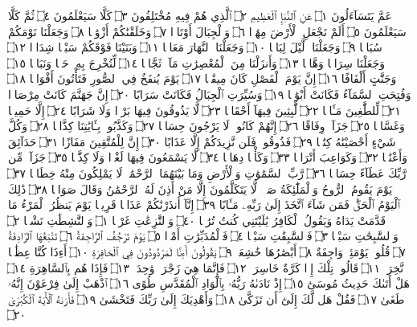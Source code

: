 عَمَّ يَتَسَآءَلُونَ ۝١ عَنِ ٱلنَّبَإِ ٱلْعَظِيمِ ۝٢ ٱلَّذِي هُمْ فِيهِ مُخْتَلِفُونَ ۝٣
كَلَّا سَيَعْلَمُونَ ۝٤ ثُمَّ كَلَّا سَيَعْلَمُونَ ۝٥ أَلَمْ نَجْعَلِ ٱلْأَرْضَ مِهَٰدࣰا ۝٦
وَٱلْجِبَالَ أَوْتَادࣰا ۝٧ وَخَلَقْنَٰكُمْ أَزْوَٰجࣰا ۝٨ وَجَعَلْنَا نَوْمَكُمْ سُبَاتࣰا ۝٩
وَجَعَلْنَا ٱلَّيْلَ لِبَاسࣰا ۝١٠ وَجَعَلْنَا ٱلنَّهَارَ مَعَاشࣰا ۝١١ وَبَنَيْنَا
فَوْقَكُمْ سَبْعࣰا شِدَادࣰا ۝١٢ وَجَعَلْنَا سِرَاجࣰا وَهَّاجࣰا ۝١٣ وَأَنزَلْنَا مِنَ
ٱلْمُعْصِرَٰتِ مَآءࣰ ثَجَّاجࣰا ۝١٤ لِّنُخْرِجَ بِهِۦ حَبࣰّا وَنَبَاتࣰا ۝١٥ وَجَنَّٰتٍ
أَلْفَافًا ۝١٦ إِنَّ يَوْمَ ٱلْفَصْلِ كَانَ مِيقَٰتࣰا ۝١٧ يَوْمَ يُنفَخُ فِي ٱلصُّورِ
فَتَأْتُونَ أَفْوَاجࣰا ۝١٨ وَفُتِحَتِ ٱلسَّمَآءُ فَكَانَتْ أَبْوَٰبࣰا ۝١٩ وَسُيِّرَتِ
ٱلْجِبَالُ فَكَانَتْ سَرَابًا ۝٢٠ إِنَّ جَهَنَّمَ كَانَتْ مِرْصَادࣰا ۝٢١ لِّلطَّٰغِينَ
مَـَٔابࣰا ۝٢٢ لَّٰبِثِينَ فِيهَآ أَحْقَابࣰا ۝٢٣ لَّا يَذُوقُونَ فِيهَا بَرْدࣰا وَلَا
شَرَابًا ۝٢٤ إِلَّا حَمِيمࣰا وَغَسَّاقࣰا ۝٢٥ جَزَآءࣰ وِفَاقًا ۝٢٦ إِنَّهُمْ كَانُوا۟
لَا يَرْجُونَ حِسَابࣰا ۝٢٧ وَكَذَّبُوا۟ بِـَٔايَٰتِنَا كِذَّابࣰا ۝٢٨ وَكُلَّ شَيْءٍ
أَحْصَيْنَٰهُ كِتَٰبࣰا ۝٢٩ فَذُوقُوا۟ فَلَن نَّزِيدَكُمْ إِلَّا عَذَابًا ۝٣٠
إِنَّ لِلْمُتَّقِينَ مَفَازًا ۝٣١ حَدَآئِقَ وَأَعْنَٰبࣰا ۝٣٢ وَكَوَاعِبَ أَتْرَابࣰا ۝٣٣ وَكَأْسࣰا
دِهَاقࣰا ۝٣٤ لَّا يَسْمَعُونَ فِيهَا لَغْوࣰا وَلَا كِذَّٰبࣰا ۝٣٥ جَزَآءࣰ مِّن رَّبِّكَ عَطَآءً
حِسَابࣰا ۝٣٦ رَّبِّ ٱلسَّمَٰوَٰتِ وَٱلْأَرْضِ وَمَا بَيْنَهُمَا ٱلرَّحْمَٰنِۖ لَا يَمْلِكُونَ
مِنْهُ خِطَابࣰا ۝٣٧ يَوْمَ يَقُومُ ٱلرُّوحُ وَٱلْمَلَٰٓئِكَةُ صَفࣰّاۖ لَّا يَتَكَلَّمُونَ
إِلَّا مَنْ أَذِنَ لَهُ ٱلرَّحْمَٰنُ وَقَالَ صَوَابࣰا ۝٣٨ ذَٰلِكَ ٱلْيَوْمُ ٱلْحَقُّۖ فَمَن
شَآءَ ٱتَّخَذَ إِلَىٰ رَبِّهِۦ مَـَٔابًا ۝٣٩ إِنَّآ أَنذَرْنَٰكُمْ عَذَابࣰا قَرِيبࣰا يَوْمَ يَنظُرُ
ٱلْمَرْءُ مَا قَدَّمَتْ يَدَاهُ وَيَقُولُ ٱلْكَافِرُ يَٰلَيْتَنِي كُنتُ تُرَٰبَۢا ۝٤٠
وَٱلنَّٰزِعَٰتِ غَرْقࣰا ۝١ وَٱلنَّٰشِطَٰتِ نَشْطࣰا ۝٢ وَٱلسَّٰبِحَٰتِ سَبْحࣰا ۝٣
فَٱلسَّٰبِقَٰتِ سَبْقࣰا ۝٤ فَٱلْمُدَبِّرَٰتِ أَمْرࣰا ۝٥ يَوْمَ تَرْجُفُ ٱلرَّاجِفَةُ ۝٦
تَتْبَعُهَا ٱلرَّادِفَةُ ۝٧ قُلُوبࣱ يَوْمَئِذࣲ وَاجِفَةٌ ۝٨ أَبْصَٰرُهَا خَٰشِعَةࣱ ۝٩
يَقُولُونَ أَءِنَّا لَمَرْدُودُونَ فِي ٱلْحَافِرَةِ ۝١٠ أَءِذَا كُنَّا عِظَٰمࣰا نَّخِرَةࣰ ۝١١ قَالُوا۟
تِلْكَ إِذࣰا كَرَّةٌ خَاسِرَةࣱ ۝١٢ فَإِنَّمَا هِيَ زَجْرَةࣱ وَٰحِدَةࣱ ۝١٣ فَإِذَا هُم بِٱلسَّاهِرَةِ ۝١٤
هَلْ أَتَىٰكَ حَدِيثُ مُوسَىٰٓ ۝١٥ إِذْ نَادَىٰهُ رَبُّهُۥ بِٱلْوَادِ ٱلْمُقَدَّسِ طُوًى ۝١٦
ٱذْهَبْ إِلَىٰ فِرْعَوْنَ إِنَّهُۥ طَغَىٰ ۝١٧ فَقُلْ هَل لَّكَ إِلَىٰٓ أَن تَزَكَّىٰ ۝١٨
وَأَهْدِيَكَ إِلَىٰ رَبِّكَ فَتَخْشَىٰ ۝١٩ فَأَرَىٰهُ ٱلْأٓيَةَ ٱلْكُبْرَىٰ ۝٢٠
